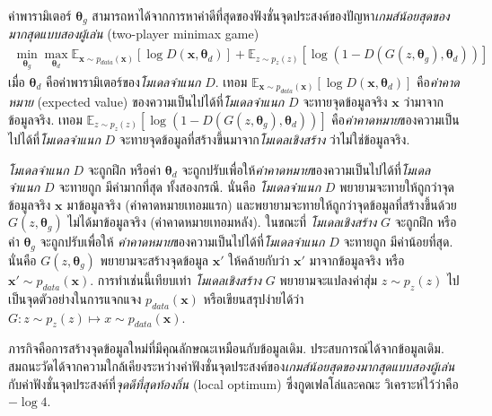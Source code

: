 ค่าพารามิเตอร์ $\bm{\theta}_g$ สามารถหาได้จากการหาค่าดีที่สุดของฟังชั่นจุดประสงค์ของปัญหา\textit{เกมส์น้อยสุดของมากสุดแบบสองผู้เล่น} (two-player minimax game)
\begin{eqnarray}
\min_{\bm{\theta}_g} \max_{\bm{\theta}_d} \mathbb{E}_{\bm{x} \sim p_{data}(\bm{x})}\left[ \log D(\bm{x}, \bm{\theta}_d) \right] 
+ \mathbb{E}_{z \sim p_z(z)}\left[ \log (1 - D(G(z, \bm{\theta}_g), \bm{\theta}_d) ) \right]
\end{eqnarray}
เมื่อ $\bm{\theta}_d$ คือค่าพารามิเตอร์ของ\textit{โมเดลจำแนก} $D$.
เทอม $\mathbb{E}_{\bm{x} \sim p_{data}(\bm{x})}\left[ \log D(\bm{x}, \bm{\theta}_d) \right]$ คือ\textit{ค่าคาดหมาย} (expected value) ของความเป็นไปได้ที่\textit{โมเดลจำแนก} $D$ จะทายจุดข้อมูลจริง $\bm{x}$ ว่ามาจากข้อมูลจริง.
เทอม $\mathbb{E}_{z \sim p_z(z)}\left[ \log (1 - D(G(z, \bm{\theta}_g), \bm{\theta}_d) ) \right]$
คือ\textit{ค่าคาดหมาย}ของความเป็นไปได้ที่\textit{โมเดลจำแนก} $D$ จะทายจุดข้อมูลที่สร้างขึ้นมาจาก\textit{โมเดลเชิงสร้าง} ว่าไม่ใช่ข้อมูลจริง.

\textit{โมเดลจำแนก} $D$ จะถูกฝึก หรือค่า $\bm{\theta}_d$ จะถูกปรับเพื่อให้\textit{ค่าคาดหมาย}ของความเป็นไปได้ที่\textit{โมเดลจำแนก} $D$ จะทายถูก มีค่ามากที่สุด 
ทั้งสองกรณี.
นั่นคือ \textit{โมเดลจำแนก} $D$ พยายามจะทายให้ถูกว่าจุดข้อมูลจริง $\bm{x}$ มาข้อมูลจริง (ค่าคาดหมายเทอมแรก) และพยายามจะทายให้ถูกว่าจุดข้อมูลที่สร้างขึ้นด้วย $G(z, \bm{\theta}_g)$ ไม่ได้มาข้อมูลจริง (ค่าคาดหมายเทอมหลัง).
ในขณะที่
\textit{โมเดลเชิงสร้าง} $G$ จะถูกฝึก หรือค่า $\bm{\theta}_g$ จะถูกปรับเพื่อให้
\textit{ค่าคาดหมาย}ของความเป็นไปได้ที่\textit{โมเดลจำแนก} $D$ จะทายถูก มีค่าน้อยที่สุด.
นั่นคือ $G(z, \bm{\theta}_g)$ พยายามจะสร้างจุดข้อมูล $\bm{x}'$ ให้คล้ายกับว่า $\bm{x}'$ มาจากข้อมูลจริง หรือ $\bm{x}' \sim p_{data}(\bm{x})$.
การทำเช่นนี้เทียบเท่า \textit{โมเดลเชิงสร้าง} $G$ พยายามจะแปลงค่าสุ่ม $z \sim p_z(z)$ ไปเป็นจุดตัวอย่างในการแจกแจง $p_{data}(\bm{x})$ หรือเขียนสรุปง่ายได้ว่า $G: z \sim p_z(z) \mapsto x \sim p_{data}(\bm{x})$.

ภารกิจคือการสร้างจุดข้อมูลใหม่ที่มีคุณลักษณะเหมือนกับข้อมูลเดิม.
ประสบการณ์ได้จากข้อมูลเดิม.
สมถนะวัดได้จากความใกล้เคียงระหว่างค่าฟังชั่นจุดประสงค์ของ\textit{เกมส์น้อยสุดของมากสุดแบบสองผู้เล่น}
กับค่าฟังชั่นจุดประสงค์ที่\textit{จุดดีที่สุดท้องถิ่น} (local optimum) ซึ่งกูดเฟลโล่และคณะ\cite{GPaMXWfOCB2014} วิเคราะห์ไว้ว่าคือ $-\log 4$.


